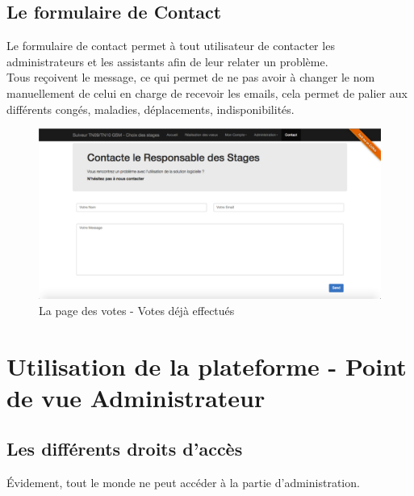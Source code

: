 \documentclass[a4paper,titlepage]{scrartcl}
\begin{document}
\clearpage

\subsection{Le formulaire de Contact}

Le formulaire de contact permet à tout utilisateur de contacter les administrateurs et les assistants afin de leur relater un problème.\\

Tous reçoivent le message, ce qui permet de ne pas avoir à changer le nom manuellement de celui en charge de recevoir les emails, cela permet de palier aux différents congés, maladies, déplacements, indisponibilités.\\

\begin{figure}[H]
	\vspace{-3mm}
	\begin{center}
		\includegraphics[scale=0.3]{Images/contact.png}
		\caption{La page des votes - Votes déjà effectués}
	\end{center}
\end{figure}

\clearpage


\section{Utilisation de la plateforme - Point de vue Administrateur}

\subsection{Les différents droits d'accès}

Évidement, tout le monde ne peut accéder à la partie d'administration.\\
\end{document}
